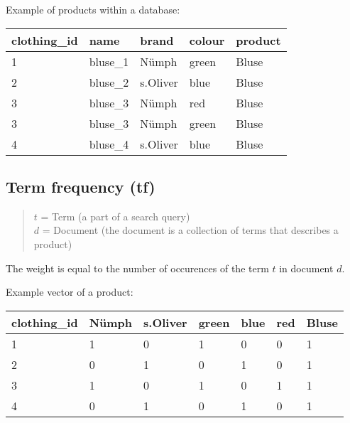 \noindent
Example of products within a database:\\

\noindent
{}
\begin{tabular}{ l l l l l }
    \rowcolor{LightSlateGrey}
    \textbf{clothing\_id}   & \textbf{name} & \textbf{brand}    & \textbf{colour}   & \textbf{product}\\\hline
    1                       & bluse\_1      & N\"umph           & green             & Bluse\\
    2                       & bluse\_2      & s.Oliver          & blue              & Bluse\\
    3                       & bluse\_3      & N\"umph           & red               & Bluse\\
    3                       & bluse\_3      & N\"umph           & green             & Bluse\\
    4                       & bluse\_4      & s.Oliver          & blue              & Bluse\\
\end{tabular}

\bigskip

\subsection{Term frequency (tf)}

\begin{quote}
    $t$ = Term (a part of a search query)\\
    $d$ = Document (the document is a collection of terms that describes a product)
\end{quote}
The weight is equal to the number of occurences of the term $t$ in document $d$.

\noindent
Example vector of a product:\\

\noindent
{}
\begin{tabular}{ l l l l l l l }
    \textbf{clothing\_id}   & \textbf{N\"umph} & \textbf{s.Oliver}   & \textbf{green}    & \textbf{blue} & \textbf{red} & \textbf{Bluse}\\\hline
    1                       & 1                 & 0                 & 1                 & 0             & 0             & 1\\
    2                       & 0                 & 1                 & 0                 & 1             & 0             & 1\\
    3                       & 1                 & 0                 & 1                 & 0             & 1             & 1\\
    4                       & 0                 & 1                 & 0                 & 1             & 0             & 1\\
\end{tabular}


